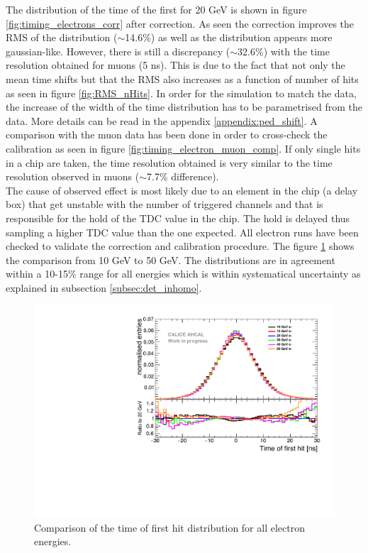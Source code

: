 The distribution of the time of the first for 20 GeV is shown in figure \ref{fig:timing_electrons_corr} after correction. As seen the correction improves the RMS of the distribution ($\sim$14.6\%) as well as the distribution appears more gaussian-like. However, there is still a discrepancy ($\sim$32.6\%) with the time resolution obtained for muons (5 ns). This is due to the fact that not only the mean time shifts but that the RMS also increases as a function of number of hits as seen in figure \ref{fig:RMS_nHits}. In order for the simulation to match the data, the increase of the width of the time distribution has to be parametrised from the data. More details can be read in the appendix \ref{appendix:ped_shift}. A comparison with the muon data has been done in order to cross-check the calibration as seen in figure \ref{fig:timing_electron_muon_comp}. If only single hits in a chip are taken, the time resolution obtained is very similar to the time resolution observed in muons ($\sim$7.7\% difference).\\
The cause of observed effect is most likely due to an element in the chip (a delay box) that get unstable with the number of triggered channels and that is responsible for the hold of the TDC value in the chip. The hold is delayed thus sampling a higher TDC value than the one expected. All electron runs have been checked to validate the correction and calibration procedure. The figure \ref{fig:all_electron_energies} shows the comparison from 10 GeV to 50 GeV. The distributions are in agreement within a 10-15\% range for all energies which is within systematical uncertainty as explained in subsection \ref{subsec:det_inhomo}.

\begin{figure}[t]
	\centering
	\includegraphics[width=1\textwidth]{chap5/fig_AHCAL_timing/Electrons/ComparisonDataEnergies.pdf}
	\caption{Comparison of the time of first hit distribution for all electron energies.}
	\label{fig:all_electron_energies}
\end{figure}

